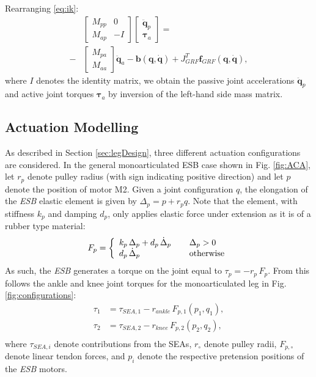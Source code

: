 \documentclass[letterpaper, 10 pt, conference]{ieeeconf}  %
\begin{document}
Rearranging \eqref{eq:ik}:
\begin{equation}
\begin{aligned}
&\left[\begin{array}{cc}  
M_{pp} & 0\\
M_{ap} &-I
\end{array} \right]
\left[\begin{array}{c}  
\mathbf{\ddot q}_p\\
\boldsymbol{\tau}_a
\end{array} \right] =\\ 
-&
\left[\begin{array}{c}  
M_{pa}\\
M_{aa}
\end{array} \right] 
\mathbf{\ddot q}_a-
\mathbf{b(q, \dot q)}+
J_{GRF}^T \mathbf{f}_{GRF}\mathbf{(q, \dot q)},
\end{aligned}
\end{equation}	
where $I$ denotes the identity matrix, we obtain the passive joint accelerations $\mathbf{\ddot q}_p$ and active joint torques $\boldsymbol{\tau}_a$ by inversion of the left-hand side mass matrix.


\subsection{Actuation Modelling}
\label{subsec:actuationModel}
As described in Section \ref{sec:legDesign}, three different actuation configurations are considered. In the general monoarticulated ESB case shown in Fig. \ref{fig:ACA}, let $r_p$ denote pulley radius (with sign indicating positive direction) and let $p$ denote the position of motor M2. Given a joint configuration $q$, the elongation of the \textit{ESB} elastic element is given by $\Delta_p = p + r_p q$. Note that the element, with stiffness $k_p$ and damping $d_p$, only applies elastic force under extension as it is of a rubber type material:
\begin{equation}
F_p =	\left\lbrace
\begin{array}{ll}
k_p \, \Delta_p + d_p \, \dot{\Delta}_p	\hspace{0.4cm} & \Delta_p > 0\\
d_p \, \dot{\Delta}_p & \text{otherwise}
\end{array}
\right.
\label{eq:F_p}
\end{equation}   
As such, the \textit{ESB} generates a torque on the joint equal to $\tau_p = -r_p \, F_p$. From this follows the ankle and knee joint torques for the monoarticulated leg in Fig. \ref{fig:configurations}:
\begin{equation}
	\begin{aligned}
		\tau_1 &= \tau_{SEA,1} - r_{ankle} \, F_{p,1}(p_1,q_1), \\
		\tau_2 &= \tau_{SEA,2} - r_{knee} \, F_{p,2}(p_2,q_2), \\
	\end{aligned}
\end{equation}
where $\tau_{SEA,i}$ denote contributions from the SEAs, $r_\circ$ denote pulley radii, $F_{p,\circ}$ denote linear tendon forces, and $p_i$ denote the respective pretension positions of the \textit{ESB} motors.
\end{document}
